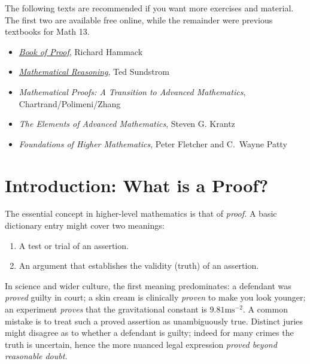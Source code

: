 
The following texts are recommended if you want more exercises and material. The first two are available free online, while the remainder were previous textbooks for Math 13.

\begin{itemize}%
	\item \href{http://www.people.vcu.edu/~rhammack/BookOfProof/}{\emph{Book of Proof}}, Richard Hammack%
	
	\item \href{http://scholarworks.gvsu.edu/books/9/}{\emph{Mathematical Reasoning}}, Ted Sundstrom%

	\item \emph{Mathematical Proofs: A Transition to Advanced Mathematics}, Chartrand/Polimeni/Zhang%
	\item \emph{The Elements of Advanced Mathematics}, Steven G. Krantz%
	\item \emph{Foundations of Higher Mathematics}, Peter Fletcher and C.~Wayne Patty%
\end{itemize}




\clearpage

\section{Introduction: What is a Proof?}\label{chap:intro}


The essential concept in higher-level mathematics is that of \emph{proof.} A basic dictionary entry might cover two meanings:
\begin{enumerate}%
	\item A test or trial of an assertion.
	\item An argument that establishes the validity (truth) of an assertion.
\end{enumerate}
In science and wider culture, the first meaning predominates: a defendant was \emph{proved} guilty in court; a skin cream is clinically \emph{proven} to make you look younger; an experiment \emph{proves} that the gravitational constant is $9.81\mathrm{ms}^{-2}$. A common mistake is to treat such a proved assertion as unambiguously true. Distinct juries might disagree as to whether a defendant is guilty; indeed for many crimes the truth is uncertain, hence the more nuanced legal expression \emph{proved beyond reasonable doubt.}\smallbreak

